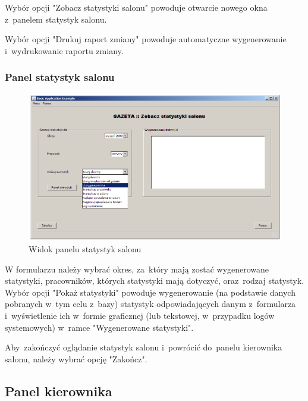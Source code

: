 Wybór opcji "Zobacz statystyki salonu" powoduje otwarcie nowego okna z~panelem statystyk salonu.

Wybór opcji "Drukuj raport zmiany" powoduje automatyczne wygenerowanie i~wydrukowanie raportu zmiany.
\clearpage
\subsubsection{Panel statystyk salonu}
\begin{figure}[h]
\begin{center}
\includegraphics[width=20cm,angle=90,keepaspectratio]{gfx/stat_salonu.png}
\end{center}
\caption{Widok panelu statystyk salonu}
\end{figure}
W formularzu należy wybrać okres, za~który mają zostać wygenerowane statystyki, pracowników, których statystyki mają dotyczyć, oraz~rodzaj statystyk. Wybór opcji "Pokaż statystyki" powoduje wygenerowanie (na podstawie danych pobranych w~tym celu z~bazy) statystyk odpowiadających danym z~formularza i~wyświetlenie ich w~formie graficznej (lub tekstowej, w~przypadku logów systemowych) w~ramce "Wygenerowane statystyki".

Aby~zakończyć oglądanie statystyk salonu i~powrócić do~panelu kierownika salonu, należy wybrać opcję "Zakończ".
\clearpage
\subsection{Panel kierownika}
